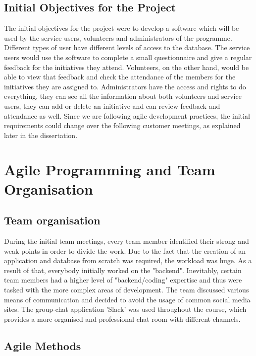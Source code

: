 \documentclass{l3proj}
\begin{document}
\subsection{Initial Objectives for the Project}
\label{objectives}

The initial objectives for the project were to develop a software which will be used by the service users, volunteers and administrators of the programme. Different types of user have different levels of access to the database. The service users would use the software to complete a small questionnaire and give a regular feedback for the initiatives they attend. Volunteers, on the other hand, would be able to view that feedback and check the attendance of the members for the initiatives they are assigned to. Administrators have the access and rights to do everything, they can see all the information about both volunteers and service users, they can add or delete an initiative and can review feedback and attendance as well. Since we are following agile development practices, the initial requirements could change over the following customer meetings, as explained later in the dissertation.

\section{Agile Programming and Team Organisation}

\subsection{Team organisation}
\label{organisation}

During the initial team meetings, every team member identified their strong and weak points in order to divide the work. Due to the fact that the creation of an application and database from scratch was required, the workload was huge. As a result of that, everybody initially worked on the "backend". Inevitably, certain team members had a higher level of "backend/coding" expertise and thus were tasked with the more complex areas of development.
The team discussed various means of communication and decided to avoid the usage of common social media sites. The group-chat application 'Slack' was used throughout the course, which provides a more organised and professional chat room with different channels.

\subsection{Agile Methods}
\label{agile}
\end{document}
